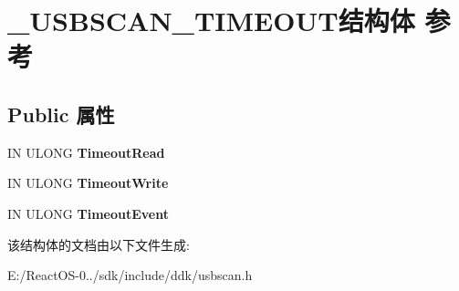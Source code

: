 \hypertarget{struct___u_s_b_s_c_a_n___t_i_m_e_o_u_t}{}\section{\+\_\+\+U\+S\+B\+S\+C\+A\+N\+\_\+\+T\+I\+M\+E\+O\+U\+T结构体 参考}
\label{struct___u_s_b_s_c_a_n___t_i_m_e_o_u_t}
\subsection*{Public 属性}
\begin{DoxyCompactItemize}
\item 
\mbox{\label{struct___u_s_b_s_c_a_n___t_i_m_e_o_u_t_ab6359cc1621750055764779ce76c7dfd}} 
IN U\+L\+O\+NG {\bfseries Timeout\+Read}
\item 
\mbox{\label{struct___u_s_b_s_c_a_n___t_i_m_e_o_u_t_a9da3308f596aa898359e2bbb5e0321a2}} 
IN U\+L\+O\+NG {\bfseries Timeout\+Write}
\item 
\mbox{\label{struct___u_s_b_s_c_a_n___t_i_m_e_o_u_t_a989b81c7ae2ca66a57d3fa64687194cf}} 
IN U\+L\+O\+NG {\bfseries Timeout\+Event}
\end{DoxyCompactItemize}


该结构体的文档由以下文件生成\+:\begin{DoxyCompactItemize}
\item 
E\+:/\+React\+O\+S-\/0../sdk/include/ddk/usbscan.\+h\end{DoxyCompactItemize}
